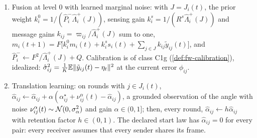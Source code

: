 \begin{definition}
\begin{enumerate}
\item[(v)] Fusion at level 0 with learned marginal noise: with $J=J_i(t)$, the prior weight $k^0_i=1/(\hat P^-_i\hat\Lambda^+_i(J))$, sensing gain $k^s_i=1/(R^s\hat\Lambda^+_i(J))$ and message gains $k_{ij}=\varpi_{ij}/\hat\Lambda^+_i(J)$ sum to one, $m_i(t+1)=F\bigl[k^0_im_i(t)+k^s_is_i(t)+\sum_{j\in J}k_{ij}\tilde y_{ij}(t)\bigr]$, and $\hat P^-_i\leftarrow F^2/\hat\Lambda^+_i(J)+Q$. Calibration is of class C1g (\cref{def:fw-calibration}), idealized: $\hat\sigma^2_{ij}=\frac1K\mathbb{E}\Vert\tilde y_{ij}(t)-\eta_t\Vert^2$ at the current error $\phi_{ij}$.
\item[(vi)] Translation learning: on rounds with $j\in J_i(t)$, $\hat\alpha_{ij}\leftarrow\hat\alpha_{ij}+\alpha(\alpha^\star_{ij}+\nu^\alpha_{ij}(t)-\hat\alpha_{ij})$, a grounded observation of the angle with noise $\nu^\alpha_{ij}(t)\sim\mathcal{N}(0,\sigma_\alpha^2)$ and gain $\alpha\in(0,1]$; then, every round, $\hat\alpha_{ij}\leftarrow h\hat\alpha_{ij}$ with retention factor $h\in(0,1)$. The declared start law has $\hat\alpha_{ij}=0$ for every pair: every receiver assumes that every sender shares its frame.
\end{enumerate}
\end{definition}


